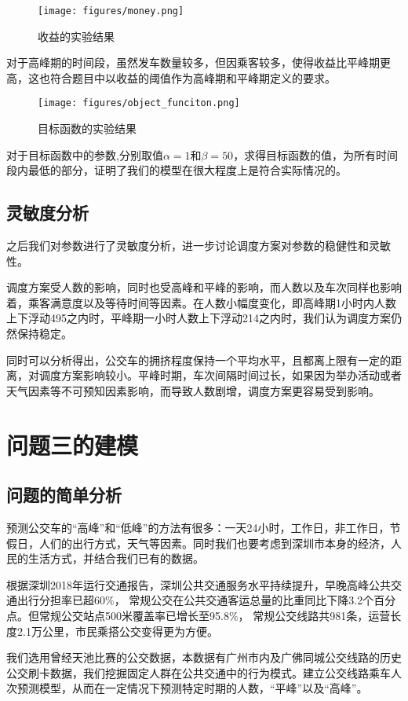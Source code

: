 \documentclass[UTF8]{ctexart}
\begin{document}
	\begin{figure}[H]
		\centering
		\texttt{[image: figures/money.png]}
		\caption {收益的实验结果}
	\end{figure}
	
	对于高峰期的时间段，虽然发车数量较多，但因乘客较多，使得收益比平峰期更高，这也符合题目中以收益的阈值作为高峰期和平峰期定义的要求。
	
	\begin{figure}[H]
		\centering
		\texttt{[image: figures/object\_funciton.png]}
		\caption {目标函数的实验结果}
	\end{figure}
	
	对于目标函数中的参数,分别取值$\alpha=1$和$\beta=50$，求得目标函数的值，为所有时间段内最低的部分，证明了我们的模型在很大程度上是符合实际情况的。
	\subsection{灵敏度分析}
	之后我们对参数进行了灵敏度分析，进一步讨论调度方案对参数的稳健性和灵敏性。
	
	调度方案受人数的影响，同时也受高峰和平峰的影响，而人数以及车次同样也影响着，乘客满意度以及等待时间等因素。在人数小幅度变化，即高峰期1小时内人数上下浮动495之内时，平峰期一小时人数上下浮动214之内时，我们认为调度方案仍然保持稳定。
	
	同时可以分析得出，公交车的拥挤程度保持一个平均水平，且都离上限有一定的距离，对调度方案影响较小。平峰时期，车次间隔时间过长，如果因为举办活动或者天气因素等不可预知因素影响，而导致人数剧增，调度方案更容易受到影响。
	
	\section{问题三的建模}
	\subsection{问题的简单分析}
	预测公交车的“高峰”和“低峰”的方法有很多：一天24小时，工作日，非工作日，节假日，人们的出行方式，天气等因素。同时我们也要考虑到深圳市本身的经济，人民的生活方式，并结合我们已有的数据。
	
	根据深圳2018年运行交通报告，深圳公共交通服务水平持续提升，早晚高峰公共交通出行分担率已超60$\%$，
	常规公交在公共交通客运总量的比重同比下降3.2个百分点。但常规公交站点500米覆盖率已增长至95.8$\%$，
	常规公交线路共981条，运营长度2.1万公里，市民乘搭公交变得更为方便。
	
	我们选用曾经天池比赛的公交数据，本数据有广州市内及广佛同城公交线路的历史公交刷卡数据，我们挖掘固定人群在公共交通中的行为模式。建立公交线路乘车人次预测模型，从而在一定情况下预测特定时期的人数，“平峰”以及“高峰”。
	
\end{document}
